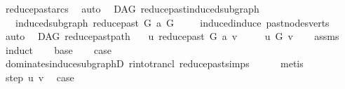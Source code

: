 \begin{isabellebody}
\ reduce{\isacharunderscore}{\kern0pt}past{\isacharunderscore}{\kern0pt}arcs\ \isamarkupfalse%
\ auto%
\endisatagproof
{\isafoldproof}%
%
\isadelimproof
\isanewline
%
\endisadelimproof
\isanewline
{}\isamarkupfalse%
\ {\isacharparenleft}{\kern0pt}\ DAG{\isacharparenright}{\kern0pt}\ reduce{\isacharunderscore}{\kern0pt}past{\isacharunderscore}{\kern0pt}induced{\isacharunderscore}{\kern0pt}subgraph{\isacharcolon}{\kern0pt}\isanewline
\ \ \ {\isachardoublequoteopen}induced{\isacharunderscore}{\kern0pt}subgraph\ {\isacharparenleft}{\kern0pt}reduce{\isacharunderscore}{\kern0pt}past\ G\ a{\isacharparenright}{\kern0pt}\ G{\isachardoublequoteclose}\isanewline
%
\isadelimproof
\ \ %
\endisadelimproof
%
\isatagproof
{}\isamarkupfalse%
\ \ induced{\isacharunderscore}{\kern0pt}induce\ past{\isacharunderscore}{\kern0pt}nodes{\isacharunderscore}{\kern0pt}verts\ \isamarkupfalse%
\ auto%
\endisatagproof
{\isafoldproof}%
%
\isadelimproof
\isanewline
%
\endisadelimproof
\isanewline
{}\isamarkupfalse%
\ {\isacharparenleft}{\kern0pt}\ DAG{\isacharparenright}{\kern0pt}\ reduce{\isacharunderscore}{\kern0pt}past{\isacharunderscore}{\kern0pt}path{\isacharcolon}{\kern0pt}\isanewline
\ \ \ {\isachardoublequoteopen}u\ {\isasymrightarrow}\isactrlsup {\isacharplus}{\kern0pt}\isactrlbsub reduce{\isacharunderscore}{\kern0pt}past\ G\ a\isactrlesub \ v{\isachardoublequoteclose}\ \isanewline
\ \ \ {\isachardoublequoteopen}\ u\ {\isasymrightarrow}\isactrlsup {\isacharplus}{\kern0pt}\isactrlbsub G\isactrlesub \ v{\isachardoublequoteclose}\isanewline
%
\isadelimproof
\ \ %
\endisadelimproof
%
\isatagproof
{}\isamarkupfalse%
\ assms\isanewline
{}\isamarkupfalse%
\ induct\isanewline
\ \ \isamarkupfalse%
\ base\ \isamarkupfalse%
\ \isamarkupfalse%
\ {\isacharquery}{\kern0pt}case\isanewline
\ \ \ \ \isamarkupfalse%
\ dominates{\isacharunderscore}{\kern0pt}induce{\isacharunderscore}{\kern0pt}subgraphD\ r{\isacharunderscore}{\kern0pt}into{\isacharunderscore}{\kern0pt}trancl{\isacharprime}{\kern0pt}\ reduce{\isacharunderscore}{\kern0pt}past{\isachardot}{\kern0pt}simps\isanewline
\ \ \ \ \isamarkupfalse%
\ metis\isanewline
{}\isamarkupfalse%
\ \isamarkupfalse%
\ {\isacharparenleft}{\kern0pt}step\ u\ v{\isacharparenright}{\kern0pt}\ \isamarkupfalse%
\ {\isacharquery}{\kern0pt}case\isanewline

\end{isabellebody}
